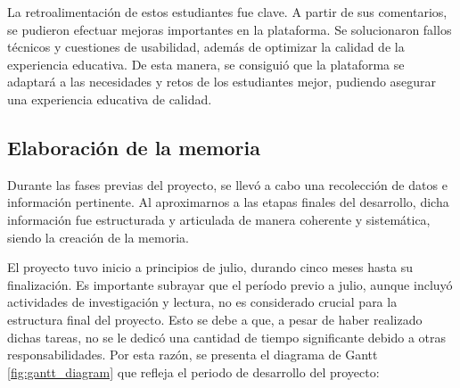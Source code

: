 La retroalimentación de estos estudiantes fue clave. A partir de sus comentarios, se pudieron efectuar mejoras importantes en la plataforma. Se solucionaron fallos técnicos y cuestiones de usabilidad, además de optimizar la calidad de la experiencia educativa. De esta manera, se consiguió que la plataforma se adaptará a las necesidades y retos de los estudiantes mejor, pudiendo asegurar una experiencia educativa de calidad.

\subsection{Elaboración de la memoria}

Durante las fases previas del proyecto, se llevó a cabo una recolección de datos e información pertinente. Al aproximarnos a las etapas finales del desarrollo, dicha información fue estructurada y articulada de manera coherente y sistemática, siendo la creación de la memoria.

El proyecto tuvo inicio a principios de julio, durando cinco meses hasta su finalización. Es importante subrayar que el período previo a julio, aunque incluyó actividades de investigación y lectura, no es considerado crucial para la estructura final del proyecto. Esto se debe a que, a pesar de haber realizado dichas tareas, no se le dedicó una cantidad de tiempo significante debido a otras responsabilidades. Por esta razón, se presenta el diagrama de Gantt \ref{fig:gantt_diagram} que refleja el periodo de desarrollo del proyecto:

